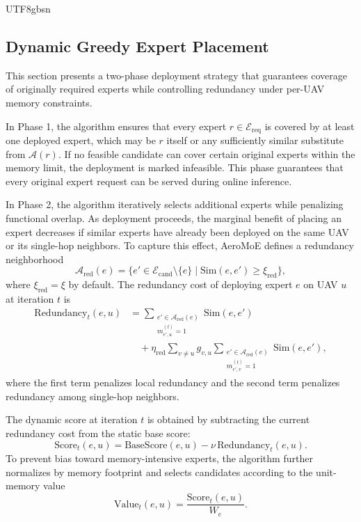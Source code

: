 \documentclass[journal]{IEEEtran}
\begin{document}
\begin{CJK*}{UTF8}{gbsn}
\subsection{Dynamic Greedy Expert Placement}
\label{sec:greedy_placement}

This section presents a two-phase deployment strategy that guarantees coverage of originally required experts while controlling redundancy under per-UAV memory constraints.

In Phase 1, the algorithm ensures that every expert \(r \in \mathcal{E}_{\mathrm{req}}\) is covered by at least one deployed expert, which may be \(r\) itself or any sufficiently similar substitute from \(\mathcal{A}(r)\). If no feasible candidate can cover certain original experts within the memory limit, the deployment is marked infeasible. This phase guarantees that every original expert request can be served during online inference.

In Phase 2, the algorithm iteratively selects additional experts while penalizing functional overlap. As deployment proceeds, the marginal benefit of placing an expert decreases if similar experts have already been deployed on the same UAV or its single-hop neighbors. To capture this effect, AeroMoE defines a redundancy neighborhood
\begin{equation}\label{e30}
\mathcal{A}_{\mathrm{red}}(e) =\! \{ e' \in \mathcal{E}_{\mathrm{cand}} \setminus \{e\} \mid \mathrm{Sim}(e,e') \ge \xi_{\mathrm{red}} \},
\end{equation}
where \(\xi_{\mathrm{red}} = \xi\) by default. The redundancy cost of deploying expert \(e\) on UAV \(u\) at iteration \(t\) is
\begin{equation}\label{eq:redundancy}
\begin{aligned}
\mathrm{Redundancy}_t(e,u) &= \!\!\!\!
\sum_{\substack{e' \in \mathcal{A}_{\mathrm{red}}(e) \\ m_{e',u}^{(t)}=1}} \mathrm{Sim}(e,e') \\
&\quad + \eta_{\mathrm{red}} \sum_{v \neq u} g_{v,u} \!\!\!\!\!
\sum_{\substack{e' \in \mathcal{A}_{\mathrm{red}}(e) \\ m_{e',v}^{(t)}=1}} \!\!\!\!\!\mathrm{Sim}(e,e'),
\end{aligned}
\end{equation}
where the first term penalizes local redundancy and the second term penalizes redundancy among single-hop neighbors.

The dynamic score at iteration \(t\) is obtained by subtracting the current redundancy cost from the static base score:
\begin{equation}
\mathrm{Score}_t(e,u) \!=\! \mathrm{BaseScore}(e,u) \!-\! \nu \, \mathrm{Redundancy}_t(e,u).
\end{equation}
To prevent bias toward memory-intensive experts, the algorithm further normalizes by memory footprint and selects candidates according to the unit-memory value
\begin{equation}\label{eq:value_t}
\mathrm{Value}_t(e,u) = \frac{\mathrm{Score}_t(e,u)}{W_e}.
\end{equation}


\end{CJK*}
\end{document}
